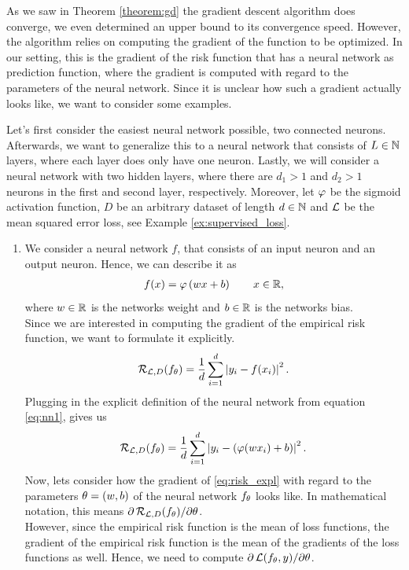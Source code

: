 As we saw in  Theorem \ref{theorem:gd} the gradient descent algorithm does converge, we even determined an upper bound to its convergence speed. However, the algorithm relies on computing the gradient of the function to be optimized. In our setting, this is the gradient of the risk function that has a neural network as prediction function, where the gradient is computed with regard to the parameters of the neural network. Since it is unclear how such a gradient actually looks like, we want to consider some examples.

\begin{example}\label{ex:nn_gradients_1dim}
Let's first consider the easiest neural network possible, two connected neurons. Afterwards, we want to generalize this to a neural network that consists of $L\in\operatorname{\mathbb{N}}$ layers, where each layer does only have one neuron. Lastly, we will consider a neural network with two hidden layers, where there are $d_1>1$ and $d_2>1$ neurons in the first and second layer, respectively. Moreover, let $\operatorname{\varphi}$ be the sigmoid activation function, $D$ be an arbitrary dataset of length $d\in\operatorname{\mathbb{N}}$ and $\operatorname{\mathcal{L}}$ be the mean squared error loss, see Example \ref{ex:supervised_loss}.
\begin{enumerate}
\item We consider a neural network $f$, that consists of an input neuron and an output neuron. Hence, we can describe it as
\begin{align}\label{eq:nn1}
f(x) = \operatorname{\varphi}\left(wx + b\right) \qquad x\in\operatorname{\mathbb{R}},
\end{align}
where $w\in\operatorname{\mathbb{R}}$ is the networks weight and $b\in\operatorname{\mathbb{R}}$ is the networks bias.\\
Since we are interested in computing the gradient of the empirical risk function, we want to formulate it explicitly.
\begin{align*}
\operatorname{\mathcal{R}}_{\operatorname{\mathcal{L}}, D} (f_\theta) = \frac{1}{d} \sum_{i=1}^d \left| y_i - f(x_i)\right|^2.
\end{align*}
Plugging in the explicit definition of the neural network from equation \eqref{eq:nn1}, gives us
\begin{align}\label{eq:risk_expl}
\operatorname{\mathcal{R}}_{\operatorname{\mathcal{L}}, D} (f_\theta) = \frac{1}{d} \sum_{i=1}^d \left| y_i - (\operatorname{\varphi}(wx_i) + b ) \right|^2.
\end{align}
Now, lets consider how the gradient of \eqref{eq:risk_expl} with regard to the parameters $\theta=(w, b)$ of the neural network $f_{\theta}$ looks like. In mathematical notation, this means $\partial \operatorname{\mathcal{R}}_{\operatorname{\mathcal{L}}, D}(f_{\theta})/\partial \theta$.\\
However, since the empirical risk function is the mean of loss functions, the gradient of the empirical risk function is the mean of the gradients of the loss functions as well. Hence, we need to compute $\partial \operatorname{\mathcal{L}}(f_{\theta}, y)/\partial \theta$.\\

\end{enumerate}
\end{example}

